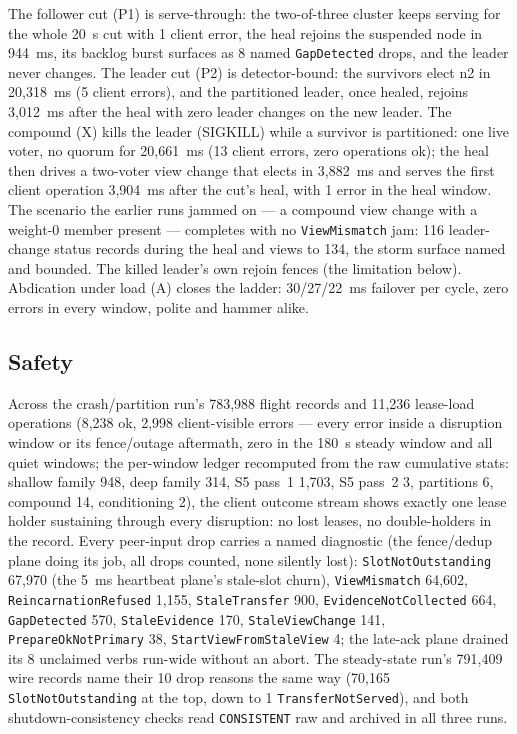 \documentclass[10pt,journal,letterpaper]{IEEEtran}
\newcommand{\code}[1]{\texttt{\small #1}}
\begin{document}
The follower cut (P1) is serve-through: the two-of-three cluster keeps
serving for the whole 20~s cut with 1 client error, the heal rejoins the
suspended node in 944~ms, its backlog burst surfaces as 8 named
\code{GapDetected} drops, and the leader never changes. The leader cut
(P2) is detector-bound: the survivors elect n2 in 20,318~ms (5 client
errors), and the partitioned leader, once healed, rejoins 3,012~ms after
the heal with zero leader changes on the new leader. The compound (X)
kills the leader (SIGKILL) while a survivor is partitioned: one live voter,
no quorum for 20,661~ms (13 client errors, zero operations ok); the heal
then drives a two-voter view change that elects in 3,882~ms and serves the
first client operation 3,904~ms after the cut's heal, with 1 error in the
heal window. The scenario the earlier runs jammed on --- a compound view
change with a weight-0 member present --- completes with no
\code{ViewMismatch} jam: 116 leader-change status records during the heal
and views to 134, the storm surface named and bounded. The killed leader's
own rejoin fences (the limitation below). Abdication under load (A) closes
the ladder: 30/27/22~ms failover per cycle, zero errors in every window,
polite and hammer alike.

\subsection{Safety}\label{sec:exp-safety}

Across the crash/partition run's 783,988 flight records and 11,236
lease-load operations (8,238 ok, 2,998 client-visible errors --- every
error inside a disruption window or its fence/outage aftermath, zero in
the 180~s steady window and all quiet windows; the per-window ledger
recomputed from the raw cumulative stats: shallow family 948, deep family
314, S5 pass~1 1,703, S5 pass~2 3, partitions 6, compound 14, conditioning
2), the client outcome stream shows exactly one lease holder sustaining
through every disruption: no lost leases, no double-holders in the record.
Every peer-input drop carries a named diagnostic (the fence/dedup plane
doing its job, all drops counted, none silently lost):
\code{SlotNotOutstanding} 67,970 (the 5~ms heartbeat plane's stale-slot
churn), \code{ViewMismatch} 64,602, \code{ReincarnationRefused} 1,155,
\code{StaleTransfer} 900, \code{EvidenceNotCollected} 664,
\code{GapDetected} 570, \code{StaleEvidence} 170, \code{StaleViewChange}
141, \code{PrepareOkNotPrimary} 38, \code{StartViewFromStaleView} 4; the
late-ack plane drained its 8 unclaimed verbs run-wide without an abort.
The steady-state run's 791,409 wire records name their 10 drop reasons the
same way (70,165 \code{SlotNotOutstanding} at the top, down to 1
\code{TransferNotServed}), and both shutdown-consistency checks read
\code{CONSISTENT} raw and archived in all three runs.
\end{document}
